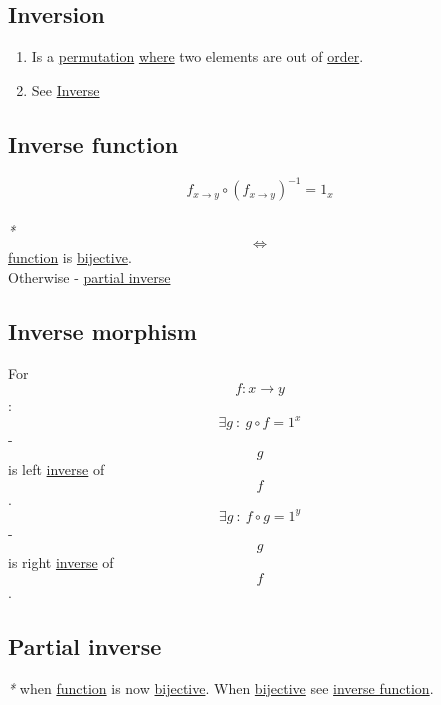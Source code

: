 \documentclass[11pt]{article}
\begin{document}
\subsection{\label{orgc8ca7a2}Inversion}
\label{sec:orgbb87944}

\begin{enumerate}
\item Is a \hyperref[orga04f0ff]{permutation} \hyperref[orgefd1ecd]{where} two elements are out of \hyperref[org8544276]{order}.\\

\item See \hyperref[org41275e7]{Inverse}\\
\end{enumerate}

\subsection{\label{org47c04f0}Inverse function}
\label{sec:org9319ab4}

$$ f_{x \to y} \circ ({f_{x \to y}})^{-1} = {1}_{x} $$\\

\emph{*} $$ \iff $$ \hyperref[orgeb5cddb]{function} is \hyperref[orge215793]{bijective}.\\
Otherwise - \hyperref[orgd7c3a90]{partial inverse}\\

\subsection{\label{org0378381}Inverse morphism}
\label{sec:org53d74eb}
For $$ f: x \to y $$:\\
$$ \exists g \ : \ g \circ f = 1^{x} $$ - $$ g $$ is left \hyperref[org41275e7]{inverse} of $$ f $$.\\
$$ \exists g \ : \ f \circ g = 1^{y} $$ - $$ g $$ is right \hyperref[org41275e7]{inverse} of $$ f $$.\\

\subsection{\label{orgd7c3a90}Partial inverse}
\label{sec:orgf4fa067}

\emph{*} when \hyperref[orgeb5cddb]{function} is now \hyperref[orge215793]{bijective}. When \hyperref[orge215793]{bijective} see \hyperref[org47c04f0]{inverse function}.\\
\end{document}
